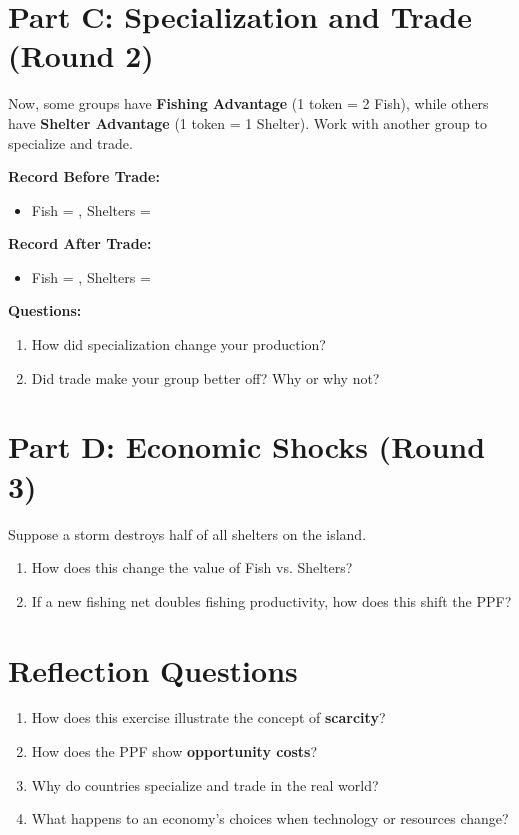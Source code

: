 \documentclass[12pt]{article}
\begin{document}
\section*{Part C: Specialization and Trade (Round 2)}
Now, some groups have \textbf{Fishing Advantage} (1 token = 2 Fish), while others have \textbf{Shelter Advantage} (1 token = 1 Shelter). Work with another group to specialize and trade.

\noindent \textbf{Record Before Trade:}
\begin{itemize}
    \item Fish = \underline{\hspace{2cm}}, Shelters = \underline{\hspace{2cm}}
\end{itemize}

\noindent \textbf{Record After Trade:}
\begin{itemize}
    \item Fish = \underline{\hspace{2cm}}, Shelters = \underline{\hspace{2cm}}
\end{itemize}

\noindent \textbf{Questions:}
\begin{enumerate}
    \item How did specialization change your production?
    \item Did trade make your group better off? Why or why not?
\end{enumerate}

\section*{Part D: Economic Shocks (Round 3)}
Suppose a storm destroys half of all shelters on the island.
\begin{enumerate}
    \item How does this change the value of Fish vs. Shelters?
    \item If a new fishing net doubles fishing productivity, how does this shift the PPF?
\end{enumerate}

\section*{Reflection Questions}
\begin{enumerate}
    \item How does this exercise illustrate the concept of \textbf{scarcity}?
    \item How does the PPF show \textbf{opportunity costs}?
    \item Why do countries specialize and trade in the real world?
    \item What happens to an economy’s choices when technology or resources change?
\end{enumerate}
\end{document}
